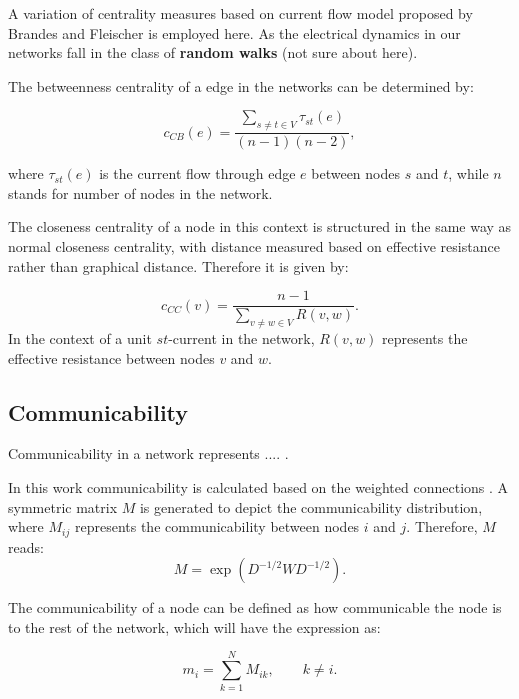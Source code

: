 \documentclass[%
 reprint,
 amsmath,amssymb,
 aps,
]{revtex4-2}
\begin{document}
A variation of centrality measures based on current flow model proposed by Brandes and Fleischer \cite{Brandes2005} is employed here. As the electrical dynamics in our networks fall in the class of \textbf{random walks} (not sure about here).

The betweenness centrality of a edge in the networks can be determined by:

\begin{equation}
c_{CB}(e) = \frac{\sum \limits_{s \neq t \in V}\tau_{st}(e)}{(n-1)(n-2)},
\label{eq:ebc}
\end{equation}



where $\tau_{st}(e)$ is the current flow through edge $e$ between nodes $s$ and $t$, while $n$ stands for number of nodes in the network.

The closeness centrality of a node in this context is structured in the same way as normal closeness centrality, with distance measured based on effective resistance rather than graphical distance. Therefore it is given by:

\begin{equation}
	c_{CC}(v) = \frac{n-1}{\sum \limits_{v \neq w \in V} R(v,w)}.
	\label{eq:ecc}
\end{equation}
In the context of a unit $st$-current in the network, $R(v,w)$ represents the effective resistance between nodes $v$ and $w$.

\subsection{\label{sec:level2} Communicability}
Communicability in a network represents .... \cite{Estrada2008}. 

In this work communicability is calculated based on the weighted connections \cite{Crofts2009}. A symmetric matrix $M$ is generated to depict the communicability distribution, where $M_{ij}$ represents the communicability between nodes $i$ and $j$. Therefore, $M$ reads:
\begin{equation}
M = \exp{(D^{-1/2} W D^{-1/2})}.
\end{equation} 

The communicability of a node can be defined as how communicable the node is to the rest of the network, which will have the expression as:

\begin{equation}
	m_i = \sum \limits_{k = 1}^N M_{ik}, \qquad k \neq i.
	\label{eq:ncomm}
\end{equation}
\end{document}
